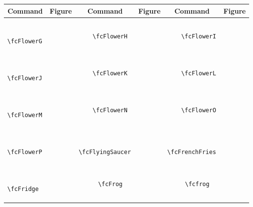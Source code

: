 \documentclass[x11names]{article}
\begin{document}
\begin{table}[H]\centering\begin{tabular}{|c|c|c|c|c|c|}\hline{\bf Command} & {\bf Figure} & {\bf Command} & {\bf Figure} & {\bf Command} & {\bf Figure}\\	\hline	&\multirow{5}{*}{	\fcFlowerG	[scale=0.16]} & &\multirow{5}{*}{	\fcFlowerH	[scale=0.16]} & &\multirow{5}{*}{	\fcFlowerI	[scale=0.16]}\\	& & & & & \\	& & & & & \\	\verb|	\fcFlowerG	| & & \verb|	\fcFlowerH	| & & \verb|	\fcFlowerI	| & \\	& & & & & \\	& & & & & \\	& & & & & \\	\hline									
		&\multirow{5}{*}{	\fcFlowerJ	[scale=0.16]} & &\multirow{5}{*}{	\fcFlowerK	[scale=0.16]} & &\multirow{5}{*}{	\fcFlowerL	[scale=0.16]}\\	& & & & & \\	& & & & & \\	\verb|	\fcFlowerJ	| & & \verb|	\fcFlowerK	| & & \verb|	\fcFlowerL	| & \\	& & & & & \\	& & & & & \\	& & & & & \\	\hline									
		&\multirow{5}{*}{	\fcFlowerM	[scale=0.16]} & &\multirow{5}{*}{	\fcFlowerN	[scale=0.16]} & &\multirow{5}{*}{	\fcFlowerO	[scale=0.16]}\\	& & & & & \\	& & & & & \\	\verb|	\fcFlowerM	| & & \verb|	\fcFlowerN	| & & \verb|	\fcFlowerO	| & \\	& & & & & \\	& & & & & \\	& & & & & \\	\hline									
		&\multirow{5}{*}{	\fcFlowerP	[scale=0.16]} & &\multirow{5}{*}{	\fcFlyingSaucer	[scale=0.64]} & &\multirow{5}{*}{	\fcFrenchFries	[scale=0.16]}\\	& & & & & \\	& & & & & \\	\verb|	\fcFlowerP	| & & \verb|	\fcFlyingSaucer	| & & \verb|	\fcFrenchFries	| & \\	& & & & & \\	& & & & & \\	& & & & & \\	\hline									
		&\multirow{5}{*}{	\fcFridge	[scale=0.16]} & &\multirow{5}{*}{	\fcFrog	[scale=0.64]} & &\multirow{5}{*}{	\fcfrog	[scale=0.16]}\\	& & & & & \\	& & & & & \\	\verb|	\fcFridge	| & & \verb|	\fcFrog	| & & \verb|	\fcfrog	| & \\	& & & & & \\	& & & & & \\	& & & & & \\	\hline									

\end{tabular}
\end{table}
\end{document}
